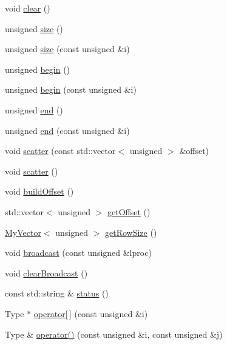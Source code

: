 \begin{DoxyCompactItemize}
\item 
void \mbox{\hyperlink{classfemus_1_1_my_matrix_ab1808ad9a2032616e6c33361bc14d522}{clear}} ()
\item 
unsigned \mbox{\hyperlink{classfemus_1_1_my_matrix_ab99498a426f2016872b4a55765fc7c04}{size}} ()
\item 
unsigned \mbox{\hyperlink{classfemus_1_1_my_matrix_a990f5949f99920cfd9f02a032982db93}{size}} (const unsigned \&i)
\item 
unsigned \mbox{\hyperlink{classfemus_1_1_my_matrix_aeb34d19dc9a44a8cc4839b31cff5d63e}{begin}} ()
\item 
unsigned \mbox{\hyperlink{classfemus_1_1_my_matrix_ab204ed386a67619364bb53449116019d}{begin}} (const unsigned \&i)
\item 
unsigned \mbox{\hyperlink{classfemus_1_1_my_matrix_adc8f45533d3acaab710e0569a152459e}{end}} ()
\item 
unsigned \mbox{\hyperlink{classfemus_1_1_my_matrix_a6da3c82decd250ee84e7692c40880ec9}{end}} (const unsigned \&i)
\item 
void \mbox{\hyperlink{classfemus_1_1_my_matrix_a5c236953941f1b007220dd91b9721ae0}{scatter}} (const std\+::vector$<$ unsigned $>$ \&offset)
\item 
void \mbox{\hyperlink{classfemus_1_1_my_matrix_a9c7ae8e6060a465333136319cabcd856}{scatter}} ()
\item 
void \mbox{\hyperlink{classfemus_1_1_my_matrix_ae65c1c929b4ab08648dde94bb8141bd3}{build\+Offset}} ()
\item 
std\+::vector$<$ unsigned $>$ \mbox{\hyperlink{classfemus_1_1_my_matrix_a11b7703db1e6021af689380608f38faa}{get\+Offset}} ()
\item 
\mbox{\hyperlink{classfemus_1_1_my_vector}{My\+Vector}}$<$ unsigned $>$ \mbox{\hyperlink{classfemus_1_1_my_matrix_a8b9f22c56f93c4906febf8b4fd626ce3}{get\+Row\+Size}} ()
\item 
void \mbox{\hyperlink{classfemus_1_1_my_matrix_a09443391549adb392acb33399287cc4d}{broadcast}} (const unsigned \&lproc)
\item 
void \mbox{\hyperlink{classfemus_1_1_my_matrix_ab466c235f5d88ec88c493119f77be25c}{clear\+Broadcast}} ()
\item 
const std\+::string \& \mbox{\hyperlink{classfemus_1_1_my_matrix_a37386775b4c35f4fb7be31497014fa4f}{status}} ()
\item 
Type $\ast$ \mbox{\hyperlink{classfemus_1_1_my_matrix_a014bbebfebe4b35d96766b69778f0e82}{operator\mbox{[}$\,$\mbox{]}}} (const unsigned \&i)
\item 
Type \& \mbox{\hyperlink{classfemus_1_1_my_matrix_a84957a60650870f940878415c93ade3c}{operator()}} (const unsigned \&i, const unsigned \&j)
\end{DoxyCompactItemize}

